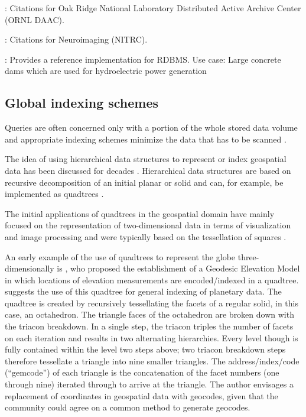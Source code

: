 \documentclass[a4paper,10pt]{article}
\begin{document}
\citep{Cook2016}: Citations for Oak Ridge National Laboratory Distributed Active Archive Center (ORNL DAAC).

\citep{Honor2016}: Citations for Neuroimaging (NITRC).

\citep{Proll2013}: Provides a reference implementation for \gls{RDBMS}. Use case: Large concrete dams which are used for hydroelectric power generation

\newpage
\subsection{Global indexing schemes}


\label{lit_index}
Queries are often concerned only with a portion of the whole stored data volume and appropriate indexing schemes minimize the data that has to be scanned \citep{Kunszt2000}.

The idea of using hierarchical data structures to represent or index geospatial data has been discussed for decades \citep{Dutton1996, Samet1988}.
Hierarchical data structures are based on recursive decomposition of an initial planar or solid and can, for example, be implemented as quadtrees \citep{Samet1988}.

The initial applications of quadtrees in the geospatial domain have mainly focused on the representation of two-dimensional data in terms of visualization and image processing and were typically based on the tessellation of squares \citep{Lugo1995}.

An early example of the use of quadtrees to represent the globe three-dimensionally is \cite{Dutton1984}, who proposed the establishment of a Geodesic Elevation Model in which locations of elevation measurements are encoded/indexed in a quadtree. 
\cite{Dutton1989} suggests the use of this quadtree for general indexing of planetary data.
The quadtree is created by recursively tessellating the facets of a regular solid, in this case, an octahedron.
The triangle faces of the octahedron are broken down with the triacon breakdown. In a single step, the triacon triples the number of facets on each iteration and results in two alternating hierarchies. Every level though is fully contained within the level two steps above; two triacon breakdown steps therefore tessellate a triangle into nine smaller triangles. The address/index/code (``gemcode'') of each triangle is the concatenation of the facet numbers (one through nine) iterated through to arrive at the triangle. The author envisages a replacement of coordinates in geospatial data with geocodes, given that the community could agree on a common method to generate geocodes.
\end{document}
